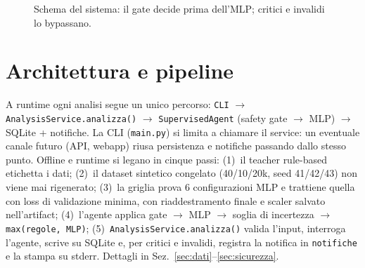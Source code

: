 \documentclass[11pt,a4paper]{article}
\newcommand{\codice}[1]{\texttt{#1}}
\newcommand{\file}[1]{\texttt{#1}}
\begin{document}
\begin{figure}[h]
\centering
{}
\caption{Schema del sistema: il gate decide
prima dell'MLP; critici e invalidi lo bypassano.}
\label{fig:schema}
\end{figure}

\section{Architettura e pipeline}\label{sec:architettura}

A runtime ogni analisi segue un unico percorso:
\codice{CLI} $\to$ \codice{AnalysisService.analizza()} $\to$
\codice{SupervisedAgent} (safety gate $\to$ MLP) $\to$ SQLite + notifiche.
La CLI (\file{main.py}) si limita a chiamare il service: un eventuale canale
futuro (API, webapp) riusa persistenza e notifiche passando dallo stesso
punto. Offline e runtime si legano in cinque passi: (1)~il teacher rule-based
etichetta i dati; (2)~il dataset sintetico congelato (40/10/20k, seed
41/42/43) non viene mai rigenerato; (3)~la griglia prova 6 configurazioni MLP
e trattiene quella con loss di validazione minima, con riaddestramento finale
e scaler salvato nell'artifact; (4)~l'agente applica gate $\to$ MLP $\to$ soglia di incertezza $\to$
\codice{max(regole, MLP)}; (5)~\codice{AnalysisService.analizza()} valida l'input, interroga
l'agente, scrive su SQLite e, per critici e invalidi, registra la notifica in
\codice{notifiche} e la stampa su stderr. Dettagli in Sez.~\ref{sec:dati}--\ref{sec:sicurezza}.
\end{document}

